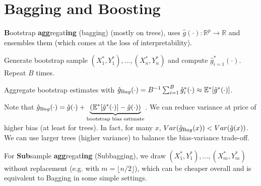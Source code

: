 \section{ Bagging and Boosting}\label{sec:bagging_and_boosting}
\begin{sectionbox}\nospacing{}
  \textbf{B}ootstrap \textbf{agg}regat\textbf{ing} (bagging) (mostly on trees), uses $\hat g(\cdot): \mathbb{R}^{p}\to \mathbb{R}$ and ensembles them (which comes at the loss of interpretability).
  \begin{enumeratenosep}[label=\roman*]
    \item Generate bootstrap sample $(X_{1}^{\ast}, Y_{1}^{\ast}), \dots, (X_{n}^{\ast}, Y_{n}^{\ast})$ and compute $\hat{g}^{\ast}_{i=1}(\cdot)$. Repeat $B$ times.
    \item Aggregate bootstrap estimates with $\hat{g}_{\textrm Bag}(\cdot) = B^{-1}\sum_{i=1}^{B} \hat{g}^{\ast}_{i}(\cdot) \approx \mathbb{E}^{\ast}[\hat{g}^{\ast}(\cdot)]$.
  \end{enumeratenosep}
  Note that $\hat{g}_{\textrm Bag}(\cdot) = \hat{g}(\cdot) + \underbrace{(\mathbb{E}^{\ast}[\hat{g}^{\ast}(\cdot)] -\hat{g}(\cdot))}_{\text{bootstrap bias estimate}}$.
  We can reduce variance at price of higher bias (at least for trees).
  In fact, for many $x$, $Var(\hat{g}_{\textrm Bag}(x)) < Var(\hat{g}(x))$. We can use larger trees (higher variance) to balance the bias-variance trade-off.

  For \textbf{Sub}sample \textbf{agg}regat\textbf{ing} (Subbagging), we draw $(X_{1}^{\ast}, Y_{1}^{\ast}), \dots, (X_{m}^{\ast}, Y_{m}^{\ast})$ without replacement (e.g. with $m = \lfloor n/2\rfloor$), which can be cheaper overall and is equivalent to Bagging in some simple settings.
\end{sectionbox}

